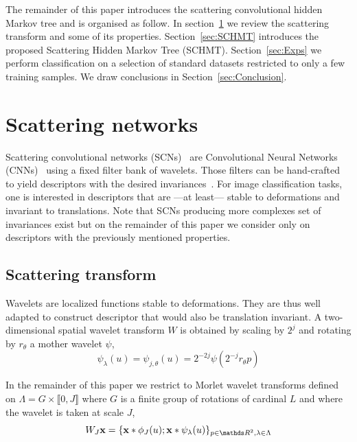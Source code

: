 \documentclass{article}
\begin{document}
  The remainder of this paper introduces the scattering convolutional hidden Markov tree and is organised as follow. In section~\ref{sec:SCN} we review the scattering transform and some of its properties. Section~\ref{sec:SCHMT} introduces the proposed Scattering Hidden Markov Tree (SCHMT). Section~\ref{sec:Exps} we perform classification on a selection of standard datasets restricted to only a few training samples. We draw conclusions in Section~\ref{sec:Conclusion}.
  
\section{Scattering networks}
  \label{sec:SCN}
  \vspace{-5pt}
  Scattering convolutional networks (SCNs)~\cite{bruna2013scattering} are Convolutional Neural Networks (CNNs)~\cite{lecun1995convolutional} using a fixed filter bank of wavelets. Those filters can be hand-crafted to yield descriptors with the desired invariances~\cite{mallat2012gis}. For image classification tasks, one is interested in descriptors that are ---at least--- stable to deformations and invariant to translations. Note that SCNs producing more complexes set of invariances exist but on the remainder of this paper we consider only on descriptors with the previously mentioned properties.

  \vspace{-5pt}
  \subsection{Scattering transform}
    \label{subsec:SCN/ST}
    \vspace{-5pt}
    Wavelets are localized functions stable to deformations. They are thus well adapted to construct descriptor that would also be translation invariant. A two-dimensional spatial wavelet transform $W$ is obtained by scaling by $2^{j}$ and rotating by $r_{\theta}$ a mother wavelet $\psi$,
    \vspace{-5pt}
    \begin{equation}
      \label{eq:multi-scale directional wavelet}
      \psi_{\lambda}(u) = \psi_{j,\theta}(u) = 2^{-2j} \psi(2^{-j}r_{\theta}p)
    \end{equation}
    
    In the remainder of this paper we restrict to Morlet wavelet transforms defined on $\Lambda = G \times \llbracket 0,J \rrbracket$ where $G$ is a finite group of rotations of cardinal $L$ and where the wavelet is taken at scale $J$,
    \vspace{-5pt}
    \begin{equation}
      \label{eq:wavelet transform}
      W_{J}\bfx = \{ \bfx \ast \phi_{J}(u); \bfx \ast \psi_{\lambda}(u) \}_{p\in\dsR^{2},\lambda \in \Lambda}
    \end{equation}
    \vspace{-15pt}
\end{document}
